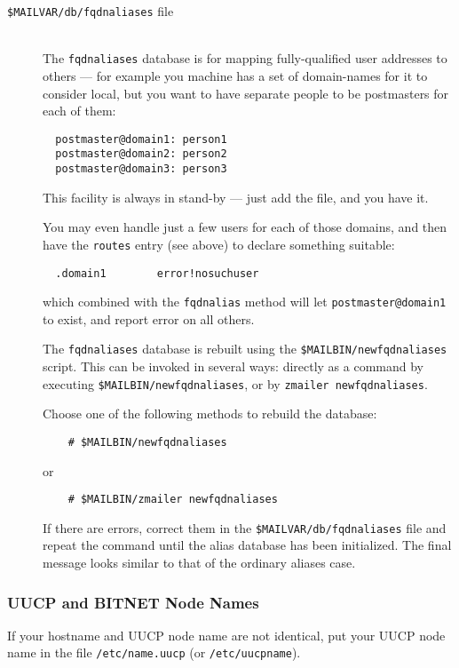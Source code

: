 \begin{description}
\item[{\tt \$MAILVAR/db/fqdnaliases} file] \mbox{} \\

The {\tt fqdnaliases} database is for mapping fully-qualified user
addresses to others --- for example you machine has a set of
domain-names for it to consider local, but you want to have
separate people to be postmasters for each of them:
\begin{verbatim}
  postmaster@domain1: person1
  postmaster@domain2: person2
  postmaster@domain3: person3
\end{verbatim}

This facility is always in stand-by --- just add the file, and
you have it.

You may even handle just a few users for each of those domains, and
then have the {\tt routes} entry (see above) to declare something suitable:
\begin{verbatim}
  .domain1        error!nosuchuser
\end{verbatim}

which combined with the {\tt fqdnalias} method will let
{\tt postmaster@domain1} to exist, and report error on all others.

The {\tt fqdnaliases} database is rebuilt using
the {\tt \$MAILBIN/newfqdnaliases} script.
This can be invoked in several ways: directly as a command
by executing {\tt \$MAILBIN/newfqdnaliases}, or
by {\tt zmailer newfqdnaliases}.

Choose one of the following methods to rebuild the database:
\begin{verbatim}
    # $MAILBIN/newfqdnaliases
\end{verbatim}
or
\begin{verbatim}
    # $MAILBIN/zmailer newfqdnaliases
\end{verbatim}

If there are errors, correct them in the {\tt \$MAILVAR/db/fqdnaliases} file
and repeat the command until the alias database has been initialized.
The final message looks similar to that of the ordinary aliases case.
\end{description}



\subsubsection{UUCP and BITNET Node Names}

If your hostname and UUCP node name are not identical, put your
UUCP node name in the file {\tt /etc/name.uucp} (or {\tt /etc/uucpname}).

